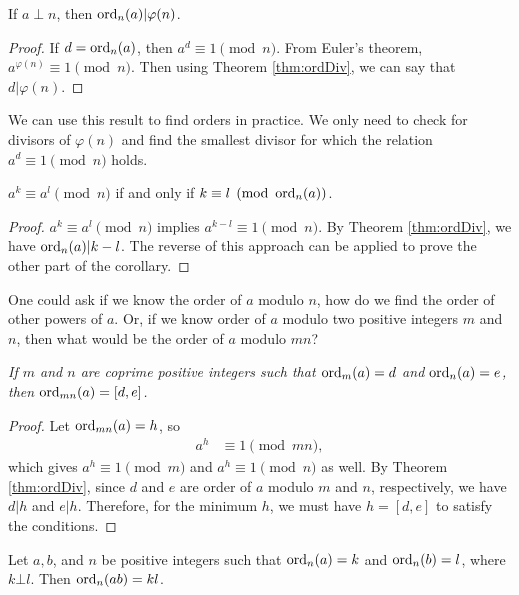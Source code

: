 \documentclass{subfile}
\begin{document}
	\begin{corollary}\label{cor:phiDiv}
		If $a\perp n$, then $\operatorname{ord}_n(a)|\varphi (n)$.
	\end{corollary}
	
	\begin{proof}
		If $d=\operatorname{ord}_n(a)$, then $a^d\equiv1\pmod n$. From Euler's theorem, $a^{\varphi (n)}\equiv1\pmod n$. Then using Theorem \ref{thm:ordDiv}, we can say that $d|\varphi (n)$.
	\end{proof}
We can use this result to find orders in practice. We only need to check for divisors of $\varphi(n)$ and find the smallest divisor for which the relation $a^d\equiv1\pmod n$ holds.
	\begin{corollary}
		$a^k\equiv a^l\pmod n$ if and only if $k\equiv l\pmod{\operatorname{ord}_n(a)}$.
	\end{corollary}
	
	\begin{proof}
		$a^k\equiv a^l\pmod n$ implies $a^{k-l} \equiv 1 \pmod n$. By Theorem \ref{thm:ordDiv}, we have $\operatorname{ord}_n(a) | k-l$. The reverse of this approach can be applied to prove the other part of the corollary.
	\end{proof}
One could ask if we know the order of $a$ modulo $n$, how do we find the order of other powers of $a$. Or, if we know order of $a$ modulo two positive integers $m$ and $n$, then what would be the order of $a$ modulo $mn$?
	\begin{theorem}\slshape
		If $m$ and $n$ are coprime positive integers such that $\operatorname{ord}_m(a)=d$ and $\operatorname{ord}_n(a)=e$, then $\operatorname{ord}_{mn}(a)=[d,e]$.\label{thm:ordL}
	\end{theorem}
	
	\begin{proof}
		Let $\operatorname{ord}_{mn}(a)=h$, so
			\begin{align*}
				a^h & \equiv1\pmod {mn},
			\end{align*} 
		which gives $a^h\equiv1\pmod m$ and $a^h\equiv1\pmod n$ as well. By Theorem \ref{thm:ordDiv}, since $d$ and $e$ are order of $a$ modulo $m$ and $n$, respectively, we have $d|h$ and $e|h$. Therefore, for the minimum $h$, we must have $h=[d,e]$ to satisfy the conditions.
	\end{proof}
	
	\begin{theorem}\label{thm:prproduct}
		Let $a,b$, and $n$ be positive integers such that $\operatorname{ord}_n(a)=k$ and $\operatorname{ord}_n(b)=l$, where $k\bot l$. Then $\operatorname{ord}_n(ab)=kl$.
	\end{theorem}
	
\end{document}
